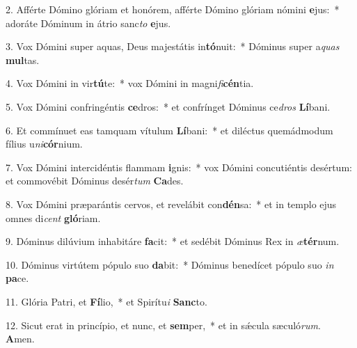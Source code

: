 2. Afférte Dómino glóriam et honórem, afférte Dómino glóriam nómini \textbf{e}jus:~*  adoráte Dóminum in átrio sanc\textit{to} \textbf{e}jus.\

3. Vox Dómini super aquas, Deus majestátis in\textbf{tó}nuit:~*  Dóminus super a\textit{quas} \textbf{mul}tas.\

4. Vox Dómini in vir\textbf{tú}te:~*  vox Dómini in magni\textit{fi}\textbf{cén}tia.\

5. Vox Dómini confringéntis \textbf{ce}dros:~*  et confrínget Dóminus ce\textit{dros} \textbf{Lí}bani.\

6. Et commínuet eas tamquam vítulum \textbf{Lí}bani:~*  et diléctus quemádmodum fílius u\textit{ni}\textbf{cór}nium.\

7. Vox Dómini intercidéntis flammam \textbf{i}gnis:~*  vox Dómini concutiéntis desértum: et commovébit Dóminus desér\textit{tum} \textbf{Ca}des.\

8. Vox Dómini præparántis cervos, et revelábit con\textbf{dén}sa:~*  et in templo ejus omnes di\textit{cent} \textbf{gló}riam.\

9. Dóminus dilúvium inhabitáre \textbf{fa}cit:~*  et sedébit Dóminus Rex in \textit{æ}\textbf{tér}num.\

10. Dóminus virtútem pópulo suo \textbf{da}bit:~*  Dóminus benedícet pópulo suo \textit{in} \textbf{pa}ce.\

11. Glória Patri, et \textbf{Fí}lio,~*  et Spirítu\textit{i} \textbf{Sanc}to.\

12. Sicut erat in princípio, et nunc, et \textbf{sem}per,~*  et in sǽcula sæculó\textit{rum}. \textbf{A}men.\

